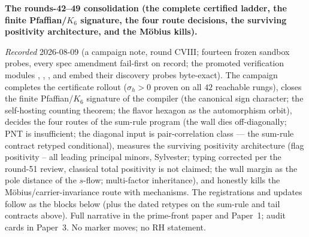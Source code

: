 \par\smallskip\noindent\textbf{The rounds-42--49 consolidation
(the complete certified ladder, the finite Pfaffian/$K_6$
signature, the four route decisions, the surviving positivity
architecture, and the M\"obius kills).}
{\sloppy
\emph{Recorded} 2026-08-09 (a campaign note, round CVIII;
fourteen frozen sandbox probes, every spec amendment fail-first
on record; the promoted verification modules
,
,
,
 and
 embed their discovery
probes byte-exact).  The campaign completes the certificate
rollout ($\sigma_h > 0$ proven on all $42$ reachable rungs),
closes the finite Pfaffian/$K_6$ signature of the compiler (the
canonical sign character; the self-hosting counting theorem;
the flavor hexagon as the automorphism orbit), decides the four
routes of the sum-rule program (the wall dies off-diagonally;
PNT is insufficient; the diagonal input is pair-correlation
class --- the sum-rule contract retyped conditional), measures
the surviving positivity architecture (flag positivity -- all leading principal minors, Sylvester; typing corrected per the round-51 review, classical total positivity is not claimed; the
wall margin as the pole distance of the $s$-flow; multi-factor
inheritance), and honestly kills the
M\"obius/carrier-invariance route with mechanisms.  The
registrations and updates follow as the blocks below (plus the
dated retypes on the sum-rule and tail contracts above).  Full
narrative in the prime-front paper and Paper~1; audit cards in
Paper~3.  No marker moves; no RH statement.\par}


